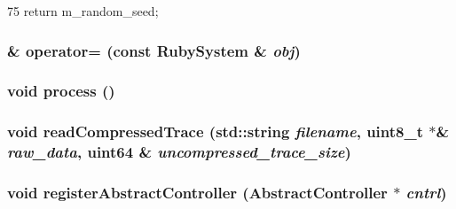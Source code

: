 \begin{DoxyCode}
75 { return m_random_seed; }
\end{DoxyCode}
\hypertarget{classRubySystem_a58b52a9b6b16a43dede7354145249435}{
\subsubsection[{operator=}]{\& operator= (const {\bf RubySystem} \& {\em obj})}}
\label{classRubySystem_a58b52a9b6b16a43dede7354145249435}
\hypertarget{classRubySystem_a2e9c5136d19b1a95fc427e0852deab5c}{
\subsubsection[{process}]{\setlength{\rightskip}{0pt plus 5cm}void process ()}}
\label{classRubySystem_a2e9c5136d19b1a95fc427e0852deab5c}
\hypertarget{classRubySystem_a94173d52d87090e6088f923496535c1d}{
\subsubsection[{readCompressedTrace}]{\setlength{\rightskip}{0pt plus 5cm}void readCompressedTrace (std::string {\em filename}, \/  uint8\_\-t $\ast$\& {\em raw\_\-data}, \/  {\bf uint64} \& {\em uncompressed\_\-trace\_\-size})}}
\label{classRubySystem_a94173d52d87090e6088f923496535c1d}
\hypertarget{classRubySystem_ab7d5364ddbfcfd86ca9a47684f12c162}{
\subsubsection[{registerAbstractController}]{\setlength{\rightskip}{0pt plus 5cm}void registerAbstractController ({\bf AbstractController} $\ast$ {\em cntrl})}}
\label{classRubySystem_ab7d5364ddbfcfd86ca9a47684f12c162}



